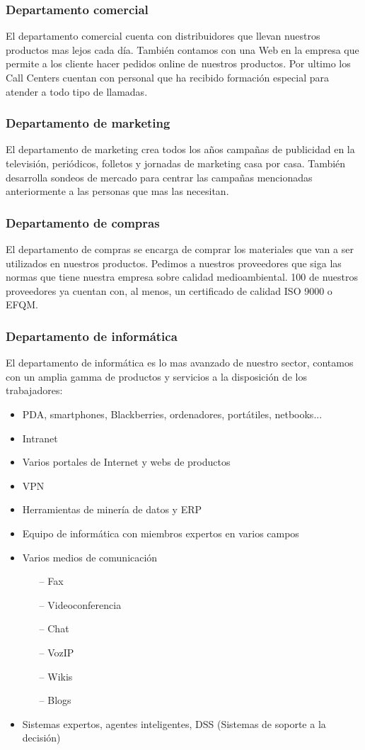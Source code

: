 \documentclass[a4paper]{article}
\begin{document}
\subsubsection{Departamento comercial}
El departamento comercial cuenta con distribuidores que llevan nuestros productos mas lejos cada día. También contamos con una Web en la empresa que permite a los cliente hacer pedidos online de nuestros productos. Por ultimo los Call Centers cuentan con personal que ha recibido formación especial para atender a todo tipo de llamadas.
\subsubsection{Departamento de marketing}
El departamento de marketing crea todos los años campañas de publicidad en la televisión, periódicos, folletos y jornadas de marketing casa por casa. También desarrolla sondeos de mercado para centrar las campañas mencionadas anteriormente a las personas que mas las necesitan.
\subsubsection{Departamento de compras}
El departamento de compras se encarga de comprar los materiales que van a ser utilizados en nuestros productos. Pedimos a nuestros proveedores que siga las normas que tiene nuestra empresa sobre calidad medioambiental. 100 de nuestros proveedores ya cuentan con, al menos, un certificado de calidad ISO 9000 o EFQM.
\subsubsection{Departamento de informática}
El departamento de informática es lo mas avanzado de nuestro sector, contamos con un amplia gamma de productos y servicios a la disposición de los trabajadores:
\begin{itemize}
	\item PDA, smartphones, Blackberries, ordenadores, portátiles, netbooks...
	\item Intranet
	\item Varios portales de Internet y webs de productos
	\item VPN
	\item Herramientas de minería de datos y ERP
	\item Equipo de informática con miembros expertos en varios campos
	\item Varios medios de comunicación
		\begin{itemize}
			\item[--] Fax
			\item[--] Videoconferencia
			\item[--] Chat
			\item[--] VozIP
			\item[--] Wikis
			\item[--] Blogs
		\end{itemize}
	\item Sistemas expertos, agentes inteligentes, DSS (Sistemas de soporte a la decisión)
	
\end{itemize}
\end{document}
